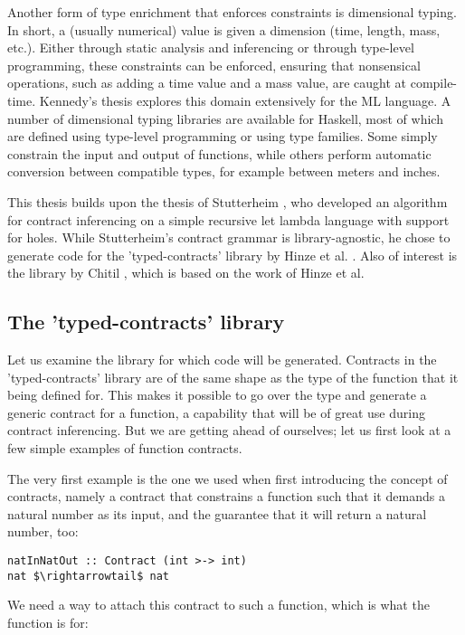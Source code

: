 \documentclass[10pt]{report}
\newcommand{\code}[1]{%
  {%
   \setlength{\fboxsep}{-2\fboxrule}%
   \fcolorbox{black}{light-gray}{\hspace{1.5pt}\strut\texttt{#1}\hspace{1.5pt}}%
  }%
}
\begin{document}
Another form of type enrichment that enforces constraints is dimensional typing.
In short, a (usually numerical) value is given a dimension (time, length, mass, etc.).
Either through static analysis and inferencing or through type-level programming, these constraints can be enforced, ensuring that nonsensical operations, such as adding a time value and a mass value, are caught at compile-time.
Kennedy's thesis \cite{langanddim} explores this domain extensively for the ML language. 
A number of dimensional typing libraries are available for Haskell, most of which are defined using type-level programming or using type families.
Some simply constrain the input and output of functions, while others perform automatic conversion between compatible types, for example between meters and inches.

This thesis builds upon the thesis of Stutterheim \cite{Stutterheim:2013:thesis}, who developed an algorithm for contract inferencing on a simple recursive let lambda language with support for holes.
While Stutterheim's contract grammar is library-agnostic, he chose to generate code for the 'typed-contracts' library by Hinze et al. \cite{Hinze06typedcontracts}. 
Also of interest is the library by Chitil \cite{Chitil:2012ua}, which is based on the work of Hinze et al.

\subsection{The 'typed-contracts' library}
Let us examine the library for which code will be generated.
Contracts in the 'typed-contracts' library are of the same shape as the type of the function that it being defined for.
This makes it possible to go over the type and generate a generic contract for a function, a capability that will be of great use during contract inferencing.
But we are getting ahead of ourselves; let us first look at a few simple examples of function contracts.

The very first example is the one we used when first introducing the concept of contracts, namely a contract that constrains a function such that it demands a natural number as its input, and the guarantee that it will return a natural number, too:

\begin{lstlisting}[mathescape]
natInNatOut :: Contract (int >-> int)
nat $\rightarrowtail$ nat
\end{lstlisting}

We need a way to attach this contract to such a function, which is what the \code{assert} function is for:
\end{document}

